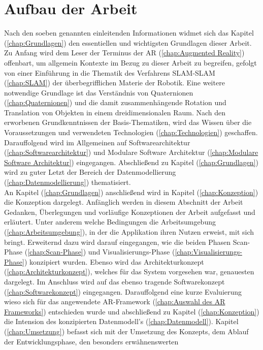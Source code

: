 \section{Aufbau der Arbeit}
\label{chap:Aufbau der Arbeit}
Nach den soeben genannten einleitenden Informationen widmet sich das Kapitel (\ref{chap:Grundlagen}) den essentiellen und wichtigsten 
Grundlagen dieser Arbeit. Zu Anfang wird dem Leser der Terminus der \acl{AR} (\ref{chap:Augmented Reality}) offenbart, um allgemein 
Kontexte im Bezug zu dieser Arbeit zu begreifen, gefolgt von einer Einführung in die Thematik des Verfahrens \ac{SLAM}-\acl{SLAM} 
(\ref{chap:SLAM}) der überbegrifflichen Materie der Robotik. Eine weitere notwendige Grundlage ist das Verständnis von Quaternionen 
(\ref{chap:Quaternionen}) und die damit zusammenhängende Rotation und Translation von Objekten in einem dreidimensionalen Raum. Nach 
den erworbenen Grundkenntnissen der Basis-Thematiken, wird das Wissen über die Voraussetzungen und verwendeten Technologien 
(\ref{chap:Technologien}) geschaffen. Darauffolgend wird im Allgemeinen auf Softwarearchitektur %
(\ref{chap:Softwarearchitektur}) und Modulare Software Architektur (\ref{chap:Modulare Software Architektur}) eingegangen. Abschließend zu 
Kapitel (\ref{chap:Grundlagen}) wird zu guter Letzt der Bereich der Datenmodellierung (\ref{chap:Datenmodellierung}) thematisiert.
\\ 
\linebreak
An Kapitel (\ref{chap:Grundlagen}) anschließend wird in Kapitel (\ref{chap:Konzeption}) die Konzeption dargelegt. Anfänglich werden in 
diesem Abschnitt der Arbeit Gedanken, Überlegungen und vorläufige Konzeptionen der Arbeit aufgefasst und erläutert. Unter anderem 
welche Bedingungen die Arbeitsumgebung (\ref{chap:Arbeitsumgebung}), in der die Applikation ihren Nutzen erweist, mit sich bringt. 
Erweiternd dazu wird darauf eingegangen, wie die beiden Phasen Scan-Phase (\ref{chap:Scan-Phase}) und Visualisierungs-Phase 
(\ref{chap:Visualisierungs-Phase}) konzipiert wurden. Ebenso wird das Architekturkonzept (\ref{chap:Architekturkonzept}), welches für das System 
vorgesehen war, genauesten dargelegt. 
Im Anschluss wird auf das ebenso tragende Softwarekonzept (\ref{chap:Softwarekonzept}) eingegangen. Darauffolgend eine kurze Evaluierung wieso sich 
für das angewendete \acs{AR}-Framework (\ref{chap:Auswahl des AR Frameworks}) entschieden wurde und abschließend zu Kapitel 
(\ref{chap:Konzeption}) die Intension des konzipierten Datenmodell's (\ref{chap:Datenmodell}). 
Kapitel (\ref{chap:Umsetzung}) befasst sich mit der Umsetzung des Konzepts, dem Ablauf der Entwicklungsphase, den besonders erwähnenswerten 
